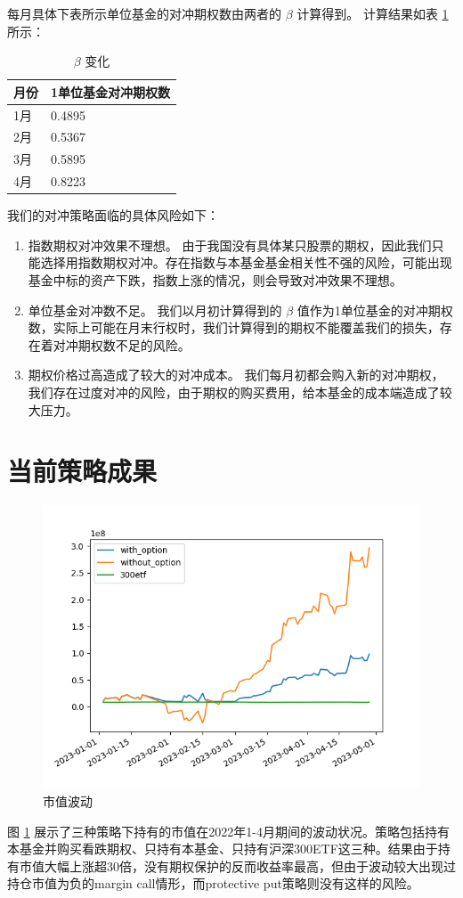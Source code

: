 \documentclass[a4paper,12pt]{ctexart}
\begin{document}
每月具体下表所示单位基金的对冲期权数由两者的 \(\beta\) 计算得到。
计算结果如表 \ref{beta} 所示：
\begin{table}[H]
	\centering
	\begin{tabular}{ll}
		月份 & 1单位基金对冲期权数 \\\hline
		1月 & 0.4895       \\
		2月 & 0.5367       \\
		3月 & 0.5895       \\
		4月 & 0.8223       \\
	\end{tabular}
	\caption{\(\beta\) 变化}
	\label{beta}
\end{table}
我们的对冲策略面临的具体风险如下：
\begin{enumerate}
	\item 指数期权对冲效果不理想。
	      由于我国没有具体某只股票的期权，因此我们只能选择用指数期权对冲。存在指数与本基金基金相关性不强的风险，可能出现基金中标的资产下跌，指数上涨的情况，则会导致对冲效果不理想。
	\item 单位基金对冲数不足。
	      我们以月初计算得到的 \(\beta\) 值作为1单位基金的对冲期权数，实际上可能在月末行权时，我们计算得到的期权不能覆盖我们的损失，存在着对冲期权数不足的风险。
	\item 期权价格过高造成了较大的对冲成本。
	      我们每月初都会购入新的对冲期权，我们存在过度对冲的风险，由于期权的购买费用，给本基金的成本端造成了较大压力。
\end{enumerate}

\section{当前策略成果}

\begin{figure}[h]
    \centering
    \includegraphics[width=0.8\linewidth]{./result.png}
    \caption{市值波动}
    \label{fig:300}
\end{figure}

图 \ref{fig:300} 展示了三种策略下持有的市值在2022年1-4月期间的波动状况。策略包括持有本基金并购买看跌期权、只持有本基金、只持有沪深300ETF这三种。结果由于持有市值大幅上涨超30倍，没有期权保护的反而收益率最高，但由于波动较大出现过持仓市值为负的margin call情形，而protective put策略则没有这样的风险。
\end{document}
